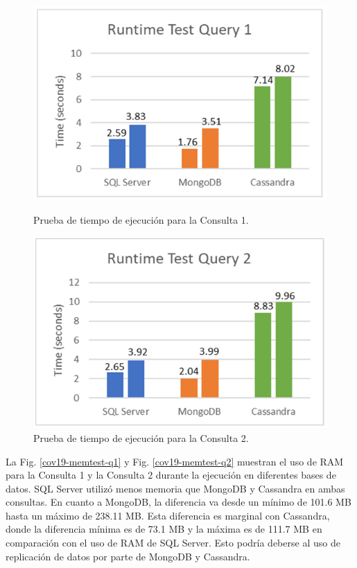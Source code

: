 \documentclass[pdflatex,sn-mathphys-num]{sn-jnl}
\theoremstyle{thmstyleone}%
\theoremstyle{thmstyletwo}%
\theoremstyle{thmstylethree}%
\begin{document}
\begin{figure}[H]
    \centering
    \begin{minipage}[b]{0.48\textwidth}
        \centering
        \includegraphics[width=\textwidth]{figs/cov19-runt-test-q1.png}
        \caption{Prueba de tiempo de ejecución para la Consulta 1.}
    \end{minipage}
    \hfill
    \begin{minipage}[b]{0.48\textwidth}
        \centering
        \includegraphics[width=\textwidth]{figs/cov19-runt-test-q2.png}
        \caption{Prueba de tiempo de ejecución para la Consulta 2.}
    \end{minipage}
\end{figure}

\vspace{-0.5cm}

La Fig. \ref{cov19-memtest-q1} y  Fig. \ref{cov19-memtest-q2} muestran el uso de RAM para la Consulta 1 y la Consulta 2 durante la ejecución en diferentes bases de datos. SQL Server utilizó menos memoria que MongoDB y Cassandra en ambas consultas. En cuanto a MongoDB, la diferencia va desde un mínimo de 101.6 MB hasta un máximo de 238.11 MB. Esta diferencia es marginal con Cassandra, donde la diferencia mínima es de 73.1 MB y la máxima es de 111.7 MB en comparación con el uso de RAM de SQL Server. Esto podría deberse al uso de replicación de datos por parte de MongoDB y Cassandra.
\end{document}
